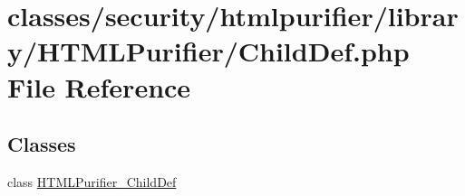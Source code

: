 \hypertarget{ChildDef_8php}{\section{classes/security/htmlpurifier/library/\+H\+T\+M\+L\+Purifier/\+Child\+Def.php File Reference}
\label{ChildDef_8php}
}
\subsection*{Classes}
\begin{DoxyCompactItemize}
\item 
class \hyperlink{classHTMLPurifier__ChildDef}{H\+T\+M\+L\+Purifier\+\_\+\+Child\+Def}
\end{DoxyCompactItemize}

